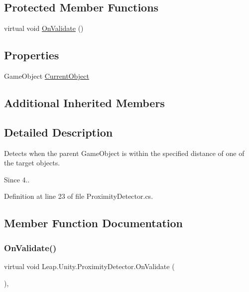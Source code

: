 \subsection*{Protected Member Functions}
\begin{DoxyCompactItemize}
\item 
virtual void \mbox{\hyperlink{class_leap_1_1_unity_1_1_proximity_detector_a2d5038a3e7f0d617da17b09eae16c8cb}{On\+Validate}} ()
\end{DoxyCompactItemize}
\subsection*{Properties}
\begin{DoxyCompactItemize}
\item 
Game\+Object \mbox{\hyperlink{class_leap_1_1_unity_1_1_proximity_detector_acc3c0aa94505f393b7a458c4dc0e482e}{Current\+Object}}
\end{DoxyCompactItemize}
\subsection*{Additional Inherited Members}


\subsection{Detailed Description}
Detects when the parent Game\+Object is within the specified distance of one of the target objects. \begin{DoxySince}{Since}
4.. 
\end{DoxySince}


Definition at line 23 of file Proximity\+Detector.\+cs.



\subsection{Member Function Documentation}
\mbox{\label{class_leap_1_1_unity_1_1_proximity_detector_a2d5038a3e7f0d617da17b09eae16c8cb}} 
\subsubsection{\texorpdfstring{OnValidate()}{OnValidate()}}
{\footnotesize\ttfamily virtual void Leap.\+Unity.\+Proximity\+Detector.\+On\+Validate (\begin{DoxyParamCaption}{ }\end{DoxyParamCaption})\hspace{0.3cm}{\ttfamily [protected]}, {\ttfamily [virtual]}}



